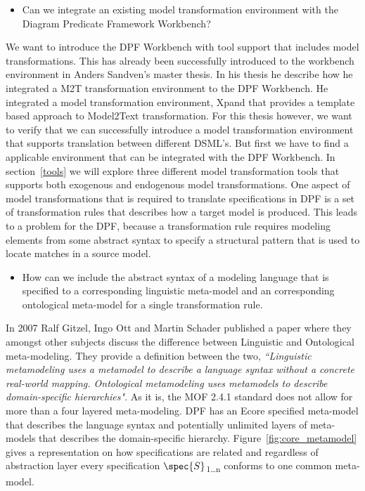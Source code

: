 \begin{itemize}
  
  \item Can we integrate an existing model transformation environment with the
  Diagram Predicate Framework Workbench?

\end{itemize}

We want to introduce the DPF Workbench with tool support that includes model
transformations. This has already been successfully introduced to the workbench
environment in Anders Sandven\cite{Sandven_thesis}'s master thesis. In his
thesis he describe how he integrated a M2T transformation environment to the DPF
Workbench. He integrated a model transformation environment, Xpand\cite{Xpand}
that provides a template based approach to Model2Text transformation. For this
thesis however, we want to verify that we can successfully introduce a model
transformation environment that supports translation between different DSML's.
But first we have to find a applicable environment that can be integrated with
the DPF Workbench. In section~\ref{tools} we will explore three different
model transformation tools that supports both exogenous and endogenous model
transformations. One aspect of model transformations that is required to
translate specifications in DPF is a set of transformation rules that describes
how a target model is produced. This leads to a problem for the DPF, because a
transformation rule requires modeling elements from some abstract syntax to
specify a structural pattern that is used to locate matches in a source model. 

\begin{itemize}  

  \item How can we include the abstract syntax of a modeling language that is
  specified to a corresponding linguistic meta-model and an corresponding 
  ontological meta-model for a single transformation rule.

\end{itemize}

In 2007 Ralf Gitzel, Ingo Ott and Martin Schader published a paper where they
amongst other subjects discuss the difference between Linguistic and
Ontological meta-modeling. They provide a definition between the two, 
\textit{``Linguistic metamodeling uses a metamodel to describe a language syntax
without a concrete real-world mapping. Ontological metamodeling uses metamodels
to describe domain-specific hierarchies"}\cite{gitzel2007ontological}. As it is,
the MOF 2.4.1 standard does not allow for more than a four layered
meta-modeling. DPF has an Ecore specified meta-model that describes the
language syntax and potentially unlimited layers of meta-models that describes the
domain-specific hierarchy. Figure~\ref{fig:core_metamodel} gives a
representation on how specifications are related and regardless of abstraction
layer every specification $\spec{S}$\textsubscript{1\ldots n} conforms to one
common meta-model.

